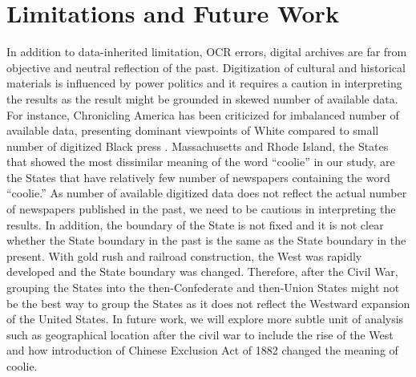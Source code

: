 \documentclass[11pt]{article}
\begin{document}
\section{Limitations and Future Work} \label{sec:limitations}
In addition to data-inherited limitation, OCR errors, 
digital archives are far from objective and neutral reflection of the past. 
Digitization of cultural and historical materials is influenced by power politics 
and it requires a caution in interpreting the results \cite{zaagsma2023digital} as the result might be grounded
in skewed number of available data. 
For instance, Chronicling America has been criticized for
imbalanced number of available data, presenting dominant viewpoints of White compared 
to small number of digitized Black press \cite{fagan2016chronicling}. 
Massachusetts and Rhode Island, the States that showed the most dissimilar meaning of the word ``coolie''
in our study, are the States that have relatively few number of newspapers containing the word ``coolie.''
As number of available digitized data does not reflect the actual number of newspapers published in the past,
we need to be cautious in interpreting the results.
In addition, the boundary of the State is not fixed and it is not clear whether the State boundary
in the past is the same as the State boundary in the present. 
With gold rush and railroad construction, the West was rapidly developed and the State boundary
was changed. Therefore, after the Civil War, grouping the States into the then-Confederate and then-Union
States might not be the best way to group the States as it does not reflect the Westward expansion of the United States.
In future work, we will explore more subtle unit of analysis such as geographical location after 
the civil war to include the rise of the West and how introduction of Chinese Exclusion Act of 1882
changed the meaning of coolie. 





\end{document}
